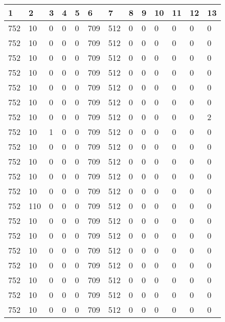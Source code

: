 \begin{table}[H]
\begin{tabular}{|l|l|l|l|l|l|l|l|l|l|l|l|l|}
\hline
\textbf{1} & \textbf{2} & \textbf{3} & \textbf{4} & \textbf{5} & \textbf{6} & \textbf{7} & \textbf{8} & \textbf{9} & \textbf{10} & \textbf{11} & \textbf{12} & \textbf{13} \\ \hline
752 & 10  & 0 & 0 & 0 & 709 & 512 & 0 & 0 & 0 & 0 & 0 & 0 \\ \hline
752 & 10  & 0 & 0 & 0 & 709 & 512 & 0 & 0 & 0 & 0 & 0 & 0 \\ \hline
752 & 10  & 0 & 0 & 0 & 709 & 512 & 0 & 0 & 0 & 0 & 0 & 0 \\ \hline
752 & 10  & 0 & 0 & 0 & 709 & 512 & 0 & 0 & 0 & 0 & 0 & 0 \\ \hline
752 & 10  & 0 & 0 & 0 & 709 & 512 & 0 & 0 & 0 & 0 & 0 & 0 \\ \hline
752 & 10  & 0 & 0 & 0 & 709 & 512 & 0 & 0 & 0 & 0 & 0 & 0 \\ \hline
752 & 10  & 0 & 0 & 0 & 709 & 512 & 0 & 0 & 0 & 0 & 0 & 2 \\ \hline
752 & 10  & 1 & 0 & 0 & 709 & 512 & 0 & 0 & 0 & 0 & 0 & 0 \\ \hline
752 & 10  & 0 & 0 & 0 & 709 & 512 & 0 & 0 & 0 & 0 & 0 & 0 \\ \hline
752 & 10  & 0 & 0 & 0 & 709 & 512 & 0 & 0 & 0 & 0 & 0 & 0 \\ \hline
752 & 10  & 0 & 0 & 0 & 709 & 512 & 0 & 0 & 0 & 0 & 0 & 0 \\ \hline
752 & 10  & 0 & 0 & 0 & 709 & 512 & 0 & 0 & 0 & 0 & 0 & 0 \\ \hline
752 & 110 & 0 & 0 & 0 & 709 & 512 & 0 & 0 & 0 & 0 & 0 & 0 \\ \hline
752 & 10  & 0 & 0 & 0 & 709 & 512 & 0 & 0 & 0 & 0 & 0 & 0 \\ \hline
752 & 10  & 0 & 0 & 0 & 709 & 512 & 0 & 0 & 0 & 0 & 0 & 0 \\ \hline
752 & 10  & 0 & 0 & 0 & 709 & 512 & 0 & 0 & 0 & 0 & 0 & 0 \\ \hline
752 & 10  & 0 & 0 & 0 & 709 & 512 & 0 & 0 & 0 & 0 & 0 & 0 \\ \hline
752 & 10  & 0 & 0 & 0 & 709 & 512 & 0 & 0 & 0 & 0 & 0 & 0 \\ \hline
752 & 10  & 0 & 0 & 0 & 709 & 512 & 0 & 0 & 0 & 0 & 0 & 0 \\ \hline
752 & 10  & 0 & 0 & 0 & 709 & 512 & 0 & 0 & 0 & 0 & 0 & 0 \\ \hline
\end{tabular}
\end{table}

